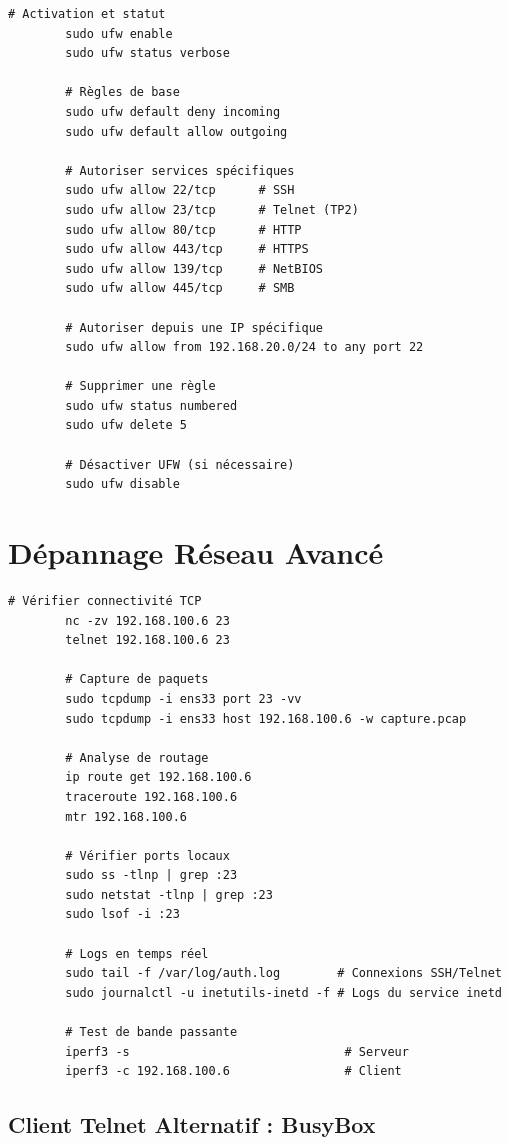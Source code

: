 \documentclass[12pt,a4paper,openany]{report}
\begin{document}
	\begin{lstlisting}[caption=Configuration UFW sur Ubuntu DMZ]
		# Activation et statut
		sudo ufw enable
		sudo ufw status verbose
		
		# Règles de base
		sudo ufw default deny incoming
		sudo ufw default allow outgoing
		
		# Autoriser services spécifiques
		sudo ufw allow 22/tcp      # SSH
		sudo ufw allow 23/tcp      # Telnet (TP2)
		sudo ufw allow 80/tcp      # HTTP
		sudo ufw allow 443/tcp     # HTTPS
		sudo ufw allow 139/tcp     # NetBIOS
		sudo ufw allow 445/tcp     # SMB
		
		# Autoriser depuis une IP spécifique
		sudo ufw allow from 192.168.20.0/24 to any port 22
		
		# Supprimer une règle
		sudo ufw status numbered
		sudo ufw delete 5
		
		# Désactiver UFW (si nécessaire)
		sudo ufw disable
	\end{lstlisting}
	
	\section{Dépannage Réseau Avancé}
	
	\begin{lstlisting}[caption=Outils de Diagnostic Réseau]
		# Vérifier connectivité TCP
		nc -zv 192.168.100.6 23
		telnet 192.168.100.6 23
		
		# Capture de paquets
		sudo tcpdump -i ens33 port 23 -vv
		sudo tcpdump -i ens33 host 192.168.100.6 -w capture.pcap
		
		# Analyse de routage
		ip route get 192.168.100.6
		traceroute 192.168.100.6
		mtr 192.168.100.6
		
		# Vérifier ports locaux
		sudo ss -tlnp | grep :23
		sudo netstat -tlnp | grep :23
		sudo lsof -i :23
		
		# Logs en temps réel
		sudo tail -f /var/log/auth.log        # Connexions SSH/Telnet
		sudo journalctl -u inetutils-inetd -f # Logs du service inetd
		
		# Test de bande passante
		iperf3 -s                              # Serveur
		iperf3 -c 192.168.100.6                # Client
	\end{lstlisting}
	
	
	\subsection{Client Telnet Alternatif : BusyBox}
	
\end{document}
